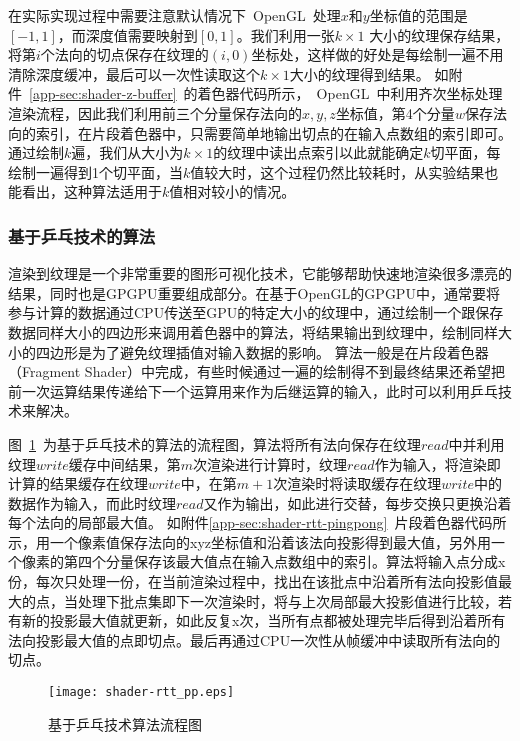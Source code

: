 在实际实现过程中需要注意默认情况下~OpenGL~处理$x$和$y$坐标值的范围是$[-1,1]$，而深度值需要映射到$[0,1]$。我们利用一张$k \times 1$ 大小的纹理保存结果，将第$i$个法向的切点保存在纹理的$(i,0)$坐标处，这样做的好处是每绘制一遍不用清除深度缓冲，最后可以一次性读取这个$k \times 1$大小的纹理得到结果。
如附件~\ref{app-sec:shader-z-buffer}~的着色器代码所示，~OpenGL~中利用齐次坐标处理渲染流程，因此我们利用前三个分量保存法向的$x,y,z$坐标值，第4个分量$w$保存法向的索引，在片段着色器中，只需要简单地输出切点的在输入点数组的索引即可。
通过绘制$k$遍，我们从大小为$k \times 1$的纹理中读出点索引以此就能确定$k$切平面，每绘制一遍得到1个切平面，当$k$值较大时，这个过程仍然比较耗时，从实验结果也能看出，这种算法适用于$k$值相对较小的情况。
	
\subsubsection{基于乒乓技术的算法}

渲染到纹理是一个非常重要的图形可视化技术，它能够帮助快速地渲染很多漂亮的结果，同时也是GPGPU重要组成部分。在基于OpenGL的GPGPU中，通常要将参与计算的数据通过CPU传送至GPU的特定大小的纹理中，通过绘制一个跟保存数据同样大小的四边形来调用着色器中的算法\cite{gpgpuqiu}，将结果输出到纹理中，绘制同样大小的四边形是为了避免纹理插值对输入数据的影响。
算法一般是在片段着色器（Fragment Shader）中完成，有些时候通过一遍的绘制得不到最终结果还希望把前一次运算结果传递给下一个运算用来作为后继运算的输入，此时可以利用乒乓技术来解决。

图~\ref{fig:shader-rtt-pingpong-flowchart}~为基于乒乓技术的算法的流程图，算法将所有法向保存在纹理$read$中并利用纹理$write$缓存中间结果，第$m$次渲染进行计算时，纹理$read$作为输入，将渲染即计算的结果缓存在纹理$write$中，在第$m+1$次渲染时将读取缓存在纹理$write$中的数据作为输入，而此时纹理$read$又作为输出，如此进行交替，每步交换只更换沿着每个法向的局部最大值。
如附件\ref{app-sec:shader-rtt-pingpong}~片段着色器代码所示，用一个像素值保存法向的xyz坐标值和沿着该法向投影得到最大值，另外用一个像素的第四个分量保存该最大值点在输入点数组中的索引。算法将输入点分成x份，每次只处理一份，在当前渲染过程中，找出在该批点中沿着所有法向投影值最大的点，当处理下批点集即下一次渲染时，将与上次局部最大投影值进行比较，若有新的投影最大值就更新，如此反复x次，当所有点都被处理完毕后得到沿着所有法向投影最大值的点即切点。最后再通过CPU一次性从帧缓冲中读取所有法向的切点。

\begin{figure}[htbp]
  \centering
  \texttt{[image: shader-rtt\_pp.eps]}
  \caption{基于乒乓技术算法流程图}
  \label{fig:shader-rtt-pingpong-flowchart}
\end{figure}

